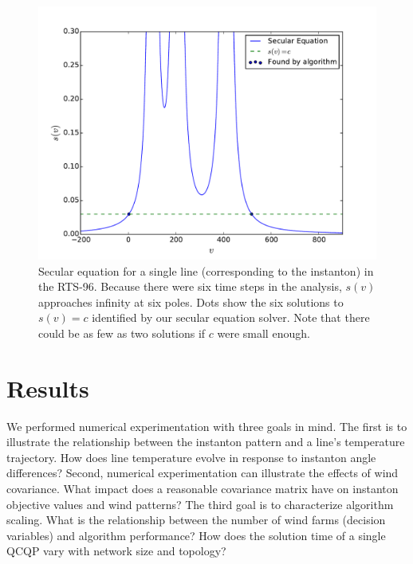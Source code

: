 \documentclass[journal,twoside]{IEEEtran}
\begin{document}
\begin{figure}[h]
\centering
\includegraphics[trim=0.3in 0.in 0.7in 0.4in,clip,width=1\linewidth]{secular}
\caption{Secular equation for a single line (corresponding to the instanton) in the RTS-96. Because there were six time steps in the analysis, $s(v)$ approaches infinity at six poles. Dots show the six solutions to $s(v) = c$ identified by our secular equation solver. Note that there could be as few as two solutions if $c$ were small enough.}
\label{fig:secular}
\end{figure}


\section{Results}\label{sec:results}
We performed numerical experimentation with three goals in mind. The first is to illustrate the relationship between the instanton pattern and a line's temperature trajectory. How does line temperature evolve in response to instanton angle differences? Second, numerical experimentation can illustrate the effects of wind covariance. What impact does a reasonable covariance matrix have on instanton objective values and wind patterns? The third goal is to characterize algorithm scaling. What is the relationship between the number of wind farms (decision variables) and algorithm performance? How does the solution time of a single QCQP vary with network size and topology?
\end{document}
